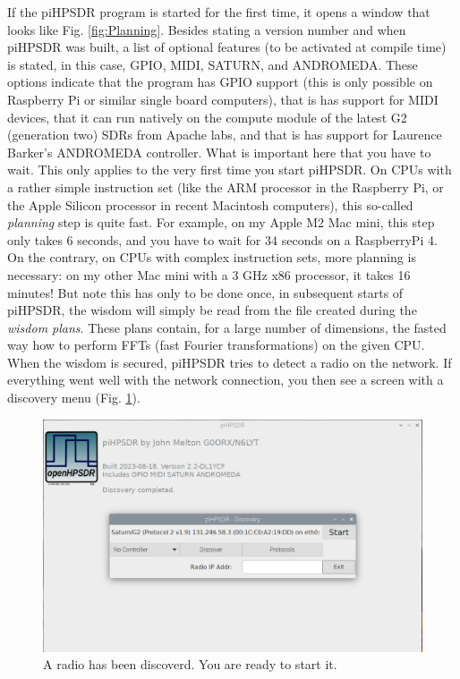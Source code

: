 \documentclass[12pt]{book}
\begin{document}
If the piHPSDR program is started for the first time, it opens a window that looks like Fig. \ref{fig:Planning}. 
Besides stating a version number and when piHPSDR was built, a list of optional features (to be activated
at compile time) is stated, in this case, GPIO, MIDI, SATURN, and ANDROMEDA. These options indicate
that the program has GPIO support (this is only possible on Raspberry Pi or similar single board computers),
that is has support for MIDI devices, that it can run natively on the compute module of the latest
G2 (generation two) SDRs from Apache labs, and that is has support for Laurence Barker's ANDROMEDA controller.
What is important here that you have to wait. This only applies to the very first time you start piHPSDR.
On CPUs with a rather simple instruction set (like the ARM processor in the Raspberry Pi, or the Apple
Silicon processor in recent Macintosh computers), this so-called  \textit{planning} step is quite fast. For example, on my
Apple M2 Mac mini, this step only takes 6 seconds, and you have to wait for 34 seconds on a RaspberryPi 4.
On the contrary, on CPUs with 
complex instruction sets, more planning is necessary: on my other Mac mini with a 3 GHz x86 processor, it
takes 16 minutes! But note
this has only to be done once, in subsequent starts of piHPSDR, the wisdom will simply be read from
the file created during the \textit{wisdom plans}. These plans contain, for a large number of dimensions, the
fasted way how to perform FFTs (fast Fourier transformations) on the given CPU.
When the wisdom is secured, piHPSDR tries to detect a radio on the network. If everything went well with
the network connection, you then see a screen with a discovery menu (Fig. \ref{fig:Start}).

\begin{figure}
\center
\includegraphics[width=12cm]{Start.png}
\caption{A radio has been discoverd. You are ready  to start it.}
\label{fig:Start}
\end{figure}
\end{document}
